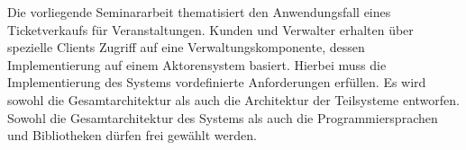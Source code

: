 Die vorliegende Seminararbeit thematisiert den Anwendungsfall eines Ticketverkaufs für Veranstaltungen.
Kunden und Verwalter erhalten über spezielle Clients Zugriff auf eine Verwaltungskomponente, dessen Implementierung auf einem Aktorensystem basiert.
Hierbei muss die Implementierung des Systems vordefinierte Anforderungen erfüllen.
Es wird sowohl die Gesamtarchitektur als auch die Architektur der Teilsysteme entworfen.
Sowohl die Gesamtarchitektur des Systems als auch die Programmiersprachen und Bibliotheken dürfen frei gewählt werden.
